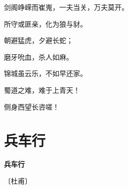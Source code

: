 \documentclass[12pt,UTF-8,openany,fontset=none]{ctexbook}
\begin{document}
\begin{center}
\begin{Large}
        剑阁峥嵘而崔嵬，一夫当关，万夫莫开。

        所守或匪亲，化为狼与豺。

        朝避猛虎，夕避长蛇；
        
        磨牙吮血，杀人如麻。

        锦城虽云乐，不如早还家。

        \hspace{16pt}蜀道之难，难于上青天！
        
        侧身西望长咨嗟！\phantom{日日日日日日日}\hspace{6pt}

    \end{Large}

\end{center}

\vspace{8pt}
\clearpage

\section{兵车行}


\begin{center}
    {\bfseries 兵车行}

    \vspace{18pt}

    \begin{large}\xuwen
        〔杜甫〕
    \end{large}

\end{center}

    \vspace{18pt}  %
\end{document}
